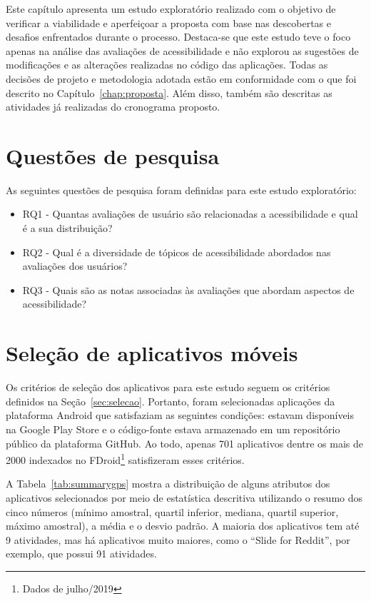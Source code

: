 Este capítulo apresenta um estudo exploratório realizado com o objetivo de verificar a viabilidade e aperfeiçoar a proposta com base nas descobertas e desafios enfrentados durante o processo. Destaca-se que este estudo teve o foco apenas na análise das avaliações de acessibilidade e não explorou as sugestões de modificações e as alterações realizadas no código das aplicações. Todas as decisões de projeto e metodologia adotada estão em conformidade com o que foi descrito no Capítulo~\ref{chap:proposta}.
Além disso, também são descritas as atividades já realizadas do cronograma proposto.

\section{Questões de pesquisa}

As seguintes questões de pesquisa foram definidas para este estudo exploratório:
\begin{itemize}
 \item RQ1 - Quantas avaliações de usuário são relacionadas a acessibilidade e qual é a sua distribuição? 
 \item RQ2 - Qual é a diversidade de tópicos de acessibilidade abordados nas avaliações dos usuários?
 \item RQ3 - Quais são as notas associadas às avaliações que abordam aspectos de acessibilidade?  
\end{itemize}

\section{Seleção de aplicativos móveis}

Os critérios de seleção dos aplicativos para este estudo seguem os critérios definidos na Seção~\ref{sec:selecao}. Portanto, foram selecionadas aplicações da plataforma Android que satisfaziam as seguintes condições: estavam disponíveis na Google Play Store e o código-fonte estava armazenado em um repositório público da plataforma GitHub. Ao todo, apenas 701 aplicativos dentre os mais de 2000  indexados no FDroid\footnote{Dados de julho/2019} satisfizeram esses critérios.

A Tabela~\ref{tab:summarygps} mostra a distribuição de alguns atributos dos aplicativos selecionados por meio de estatística descritiva utilizando o resumo dos cinco números (mínimo amostral, quartil inferior, 
mediana, quartil superior, máximo amostral), a média e o desvio padrão. 
A maioria dos aplicativos tem até 9 atividades, mas há aplicativos muito maiores, como o ``Slide for Reddit'', por exemplo, que possui 91 atividades.

